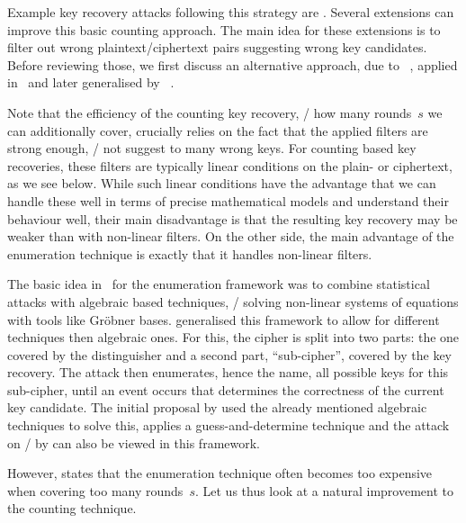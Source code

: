 Example key recovery attacks following this strategy are .
Several extensions can improve this basic counting approach.
The main idea for these extensions is to filter out wrong plaintext/ciphertext pairs suggesting wrong key candidates.
Before reviewing those, we first discuss an alternative approach, due to \citeauthor{FSE:AlbCid09}~, applied in~ and later generalised by \citeauthor{SAC:Dinur14}~.

Note that the efficiency of the counting key recovery, \ie/ how many rounds~$s$ we can additionally cover, crucially relies on the fact that the applied filters are strong enough, \ie/ not suggest to many wrong keys.
For counting based key recoveries, these filters are typically linear conditions on the plain- or ciphertext, as we see below.
While such linear conditions have the advantage that we can handle these well in terms of precise mathematical models and understand their behaviour well, their main disadvantage is that the resulting key recovery may be weaker than with non-linear filters.
On the other side, the main advantage of the enumeration technique is exactly that it handles non-linear filters.


The basic idea in~\cite{FSE:AlbCid09} for the enumeration framework was to combine statistical attacks with algebraic based techniques, \ie/ solving non-linear systems of equations with tools like Gr\"{o}bner bases.
\textcite{SAC:Dinur14} generalised this framework to allow for different techniques then algebraic ones.
For this, the cipher is split into two parts: the one covered by the distinguisher and a second part, \enquote{sub-cipher}, covered by the key recovery.
The attack then enumerates, hence the name, all possible keys for this sub-cipher, until an event occurs that determines the correctness of the current key candidate.
The initial proposal by \citeauthor{FSE:AlbCid09} used the already mentioned algebraic techniques to solve this, \citeauthor{SAC:Dinur14} applies a guess-and-determine technique and the attack on \zorro/ by \textcite{EC:BDDLKT15} can also be viewed in this framework.

However, \textcite[4]{SAC:Dinur14} states that the enumeration technique often becomes too expensive when covering too many rounds~$s$.
Let us thus look at a natural improvement to the counting technique.


